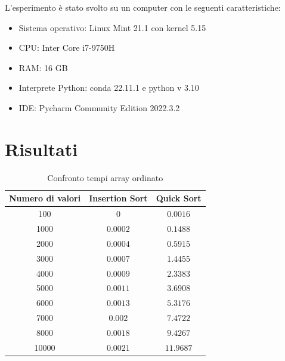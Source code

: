 \documentclass[
]{article}
\begin{document}
L'esperimento è stato svolto su un computer con le seguenti
caratteristiche:

\begin{itemize}
\item
  Sistema operativo: Linux Mint 21.1 con kernel 5.15
\item
  CPU: Inter Core i7-9750H
\item
  RAM: 16 GB
\item
  Interprete Python: conda 22.11.1 e python v 3.10
\item
  IDE: Pycharm Community Edition 2022.3.2
\end{itemize}

\hypertarget{risultati}{%
\section{Risultati}\label{risultati}}

\begin{table}[!h]
    \begin{center}
        \begin{tabular}{|c|c|c|}
            \hline \hline Numero di valori & Insertion Sort & Quick Sort \\
            \hline \hline 100              & 0              & $0.0016$   \\
            \hline 1000                    & $0.0002$       & $0.1488$   \\
            \hline 2000                    & $0.0004$       & $0.5915$   \\
            \hline 3000                    & $0.0007$       & $1.4455$   \\
            \hline 4000                    & $0.0009$       & $2.3383$   \\
            \hline 5000                    & $0.0011$       & $3.6908$   \\
            \hline 6000                    & $0.0013$       & $5.3176$   \\
            \hline 7000                    & $0.002$        & $7.4722$   \\
            \hline 8000                    & $0.0018$       & $9.4267$   \\
            \hline 10000                   & $0.0021$       & $11.9687$  \\
            \hline \hline
        \end{tabular}
    \end{center}
    \caption{Confronto tempi array ordinato}
\end{table}
\end{document}
